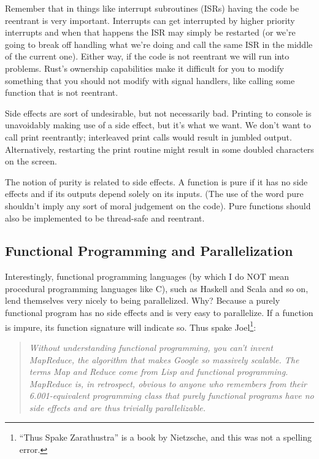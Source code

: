 Remember that in things like interrupt subroutines (ISRs) having the code be reentrant is very important. Interrupts can get interrupted by higher priority interrupts and when that happens the ISR may simply be restarted (or we're going to break off handling what we're doing and call the same ISR in the middle of the current one). Either way, if the code is not reentrant we will run into problems. Rust's ownership capabilities make it difficult for you to modify something that you should not modify with signal handlers, like calling some function that is not reentrant.

Side effects are sort of undesirable, but not necessarily bad. Printing to console is unavoidably making use of a side effect, but it's what we want. We don't want to call print reentrantly; interleaved print calls would result in jumbled output. Alternatively, restarting the print routine might result in some doubled characters on the screen.

The notion of purity is related to side effects. A function is pure if it has no side effects and if its outputs depend solely on its inputs. (The use of the word pure shouldn't imply any sort of moral judgement on the code). Pure functions should also be implemented to be thread-safe and reentrant.


\subsection*{Functional Programming and Parallelization}
Interestingly, functional programming languages (by which I do NOT mean procedural programming languages like C), such as Haskell and Scala and so on, lend themselves very nicely to being parallelized. Why? Because a purely functional program has no side effects and is very easy to parallelize. If a function is impure, its function signature will indicate so. Thus spake Joel\footnote{``Thus Spake Zarathustra'' is a book by Nietzsche, and this was not a spelling error.}:
\\ \vspace*{-2em}
\begin{quote}
\textit{Without understanding functional programming, you can't invent MapReduce, the algorithm that makes Google so massively scalable. The terms Map and Reduce come from Lisp and functional programming. MapReduce is, in retrospect, obvious to anyone who remembers from their 6.001-equivalent programming class that purely functional programs have no side effects and are thus trivially parallelizable.}~\cite{joel:functional}
\end{quote}

